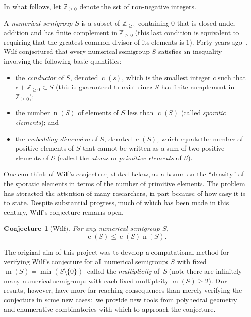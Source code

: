 \documentclass[12pt]{amsart}
\newtheorem{conj}[thm]{Conjecture}
\theoremstyle{definition}
\numberwithin{equation}{section}
\newcommand{\ring}[1]{\ensuremath{\mathbb{#1}}}
\renewcommand\>{\rangle}
\newcommand\<{\langle}
\newcommand\0{\mathbf{0}}
\newcommand\ZZ{\ring{Z}}
\begin{document}
In what follows, let $\ZZ_{\ge 0}$ denote the set of non-negative integers.  

A \emph{numerical semigroup} $S$ is a subset of $\ZZ_{\ge 0}$ containing $0$ that is closed under addition and has finite complement in $\ZZ_{\ge 0}$ (this last condition is equivalent to requiring that the greatest common divisor of its elements is $1$).  Forty years ago~\cite{wilf}, Wilf conjectured that every numerical semigroup $S$ satisfies an inequality involving the following basic quantities:
\begin{itemize}
\item 
the \emph{conductor} of $S$, denoted $\operatorname c(s)$, which is the smallest integer $c$ such that $c + \ZZ_{\ge 0} \subset S$ (this is guaranteed to exist since $S$ has finite complement in $\ZZ_{\ge 0}$);

\item 
the number $\operatorname n(S)$ of elements of $S$ less than $\operatorname c(S)$ (called \emph{sporatic elements}); and

\item 
the \emph{embedding dimension} of $S$, denoted $\operatorname e(S)$, which equals the number of positive elements of $S$ that cannot be written as a sum of two positive elements of $S$ (called the \emph{atoms} or \emph{primitive elements} of $S$).  

\end{itemize}

One can think of Wilf's conjecture, stated below, as a bound on the ``density'' of the sporatic elements in terms of the number of primitive elements.  The problem has attracted the attention of many researchers, in part because of how easy it is to state.  Despite substantial progress, much of which has been made in this century, Wilf's conjecture remains open.  

\begin{conj}[Wilf]\label{conj:wilf}
For any numerical semigroup $S$, 
\[
\operatorname c(S) \le \operatorname e(S) \operatorname n(S).
\]
\end{conj}

The original aim of this project was to develop a computational method for verifying Wilf's conjecture for all numerical semigroups $S$ with fixed $\operatorname m(S) = \min(S \setminus \{0\})$, called the \emph{multiplicity} of~$S$ (note there are infinitely many numerical semigroups with each fixed multiplcity $\operatorname m(S) \ge 2$).  Our results, however, have more far-reaching consequences than merely verifying the conjecture in some new cases:\ we provide new tools from polyhedral geometry and enumerative combinatorics with which to approach the conjecture.  
\end{document}
